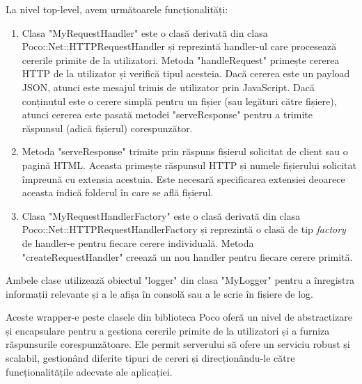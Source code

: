 La nivel top-level, avem următoarele funcționalități:

\begin{enumerate}
  \item Clasa "MyRequestHandler" este o clasă derivată din clasa Poco::Net::HTTPRequestHandler și reprezintă handler-ul care procesează cererile primite de la utilizatori. Metoda "handleRequest" primește cererea HTTP de la utilizator și verifică tipul acesteia. Dacă cererea este un payload JSON, atunci este mesajul trimis de utilizator prin JavaScript. Dacă conținutul este o cerere simplă pentru un fișier (sau legături către fișiere), atunci cererea este pasată metodei "serveResponse" pentru a trimite răspunsul (adică fișierul) corespunzător.

  \item Metoda "serveResponse" trimite prin răspuns fișierul solicitat de client sau o pagină HTML. Aceasta primește răspunsul HTTP și numele fișierului solicitat împreună cu extensia acestuia. Este necesară specificarea extensiei deoarece aceasta indică folderul în care se află fișierul.

  \item Clasa "MyRequestHandlerFactory" este o clasă derivată din clasa Poco::Net::HTTPRequestHandlerFactory și reprezintă o clasă de tip \emph{factory} de handler-e pentru fiecare cerere individuală. Metoda "createRequestHandler" creează un nou handler pentru fiecare cerere primită.
\end{enumerate}

Ambele clase utilizează obiectul "logger" din clasa "MyLogger" pentru a înregistra informații relevante și a le afișa în consolă sau a le scrie în fișiere de log.

Aceste wrapper-e peste clasele din biblioteca Poco oferă un nivel de abstractizare și encapsulare pentru a gestiona cererile primite de la utilizatori și a furniza răspunsurile corespunzătoare. Ele permit serverului să ofere un serviciu robust și scalabil, gestionând diferite tipuri de cereri și direcționându-le către funcționalitățile adecvate ale aplicației.